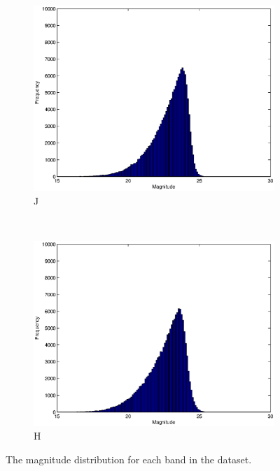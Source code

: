 \documentclass[useAMS,usenatbib,fleqn]{mn2e}
\begin{document}
\begin{figure}
\begin{subfigure}[b]{0.15\textwidth}
                \includegraphics[width=\columnwidth]{figures/J.eps}
                \caption{J}
        \end{subfigure}
         ~
        \begin{subfigure}[b]{0.15\textwidth}
                \includegraphics[width=\columnwidth]{figures/H.eps}
                \caption{H}
        \end{subfigure}
        
       \caption{The magnitude distribution for each band in the dataset.}
	\label{fig-bands-histograms}
\end{figure}
\end{document}

